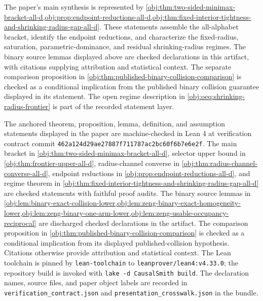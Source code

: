 The paper's main synthesis is represented by \cref{obj:thm:two-sided-minimax-bracket-all-d,obj:prop:endpoint-reductions-all-d,obj:thm:fixed-interior-tightness-and-shrinking-radius-gap-all-d}. These statements assemble the all-alphabet bracket, identify the endpoint reductions, and characterize the fixed-radius, saturation, parametric-dominance, and residual shrinking-radius regimes. The binary source lemmas displayed above are checked declarations in this artifact, with citations supplying attribution and statistical context. The separate comparison proposition in \cref{obj:thm:published-binary-collision-comparison} is checked as a conditional implication from the published binary collision guarantee displayed in its statement. The open regime description in \cref{obj:oeq:shrinking-radius-frontier} is part of the recorded statement layer.

The anchored theorem, proposition, lemma, definition, and assumption statements displayed in the paper are machine-checked in Lean 4 at verification contract commit \texttt{462a124d29ae27887f711787ac2bc60f6b7e6e2f}. The main bracket in \cref{obj:thm:two-sided-minimax-bracket-all-d}, selector upper bound in \cref{obj:thm:frontier-upper-all-d}, radius-channel converse in \cref{obj:thm:radius-channel-converse-all-d}, endpoint reductions in \cref{obj:prop:endpoint-reductions-all-d}, and regime theorem in \cref{obj:thm:fixed-interior-tightness-and-shrinking-radius-gap-all-d} are checked statements with faithful proof audits. The binary source lemmas in \cref{obj:lem:binary-exact-collision-lower,obj:lem:zeng-binary-exact-homogeneity-lower,obj:lem:zeng-binary-one-arm-lower,obj:lem:zeng-usable-occupancy-reciprocal} are discharged checked declarations in the artifact. The comparison proposition in \cref{obj:thm:published-binary-collision-comparison} is checked as a conditional implication from its displayed published-collision hypothesis. Citations otherwise provide attribution and statistical context. The Lean toolchain is pinned by \texttt{lean-toolchain} to \texttt{leanprover/lean4:v4.33.0}; the repository build is invoked with \texttt{lake -d CausalSmith build}. The declaration names, source files, and paper object labels are recorded in \texttt{verification\_contract.json} and \texttt{presentation\_crosswalk.json} in the bundle.
